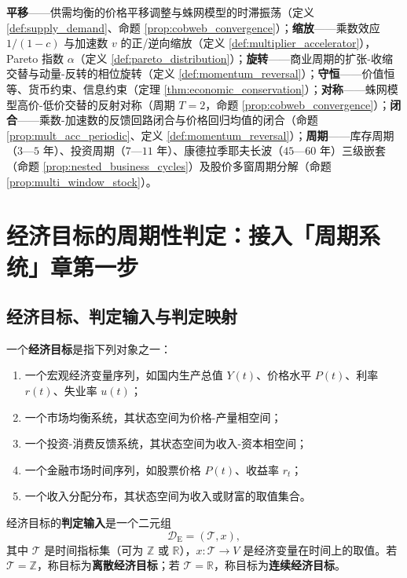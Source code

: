 \begin{remark}[本章七主题导引]\label{rem:econ_seven_themes}
\textbf{平移}——供需均衡的价格平移调整与蛛网模型的时滞振荡（定义 \ref{def:supply_demand}、命题 \ref{prop:cobweb_convergence}）；\textbf{缩放}——乘数效应 $1/(1-c)$ 与加速数 $v$ 的正/逆向缩放（定义 \ref{def:multiplier_accelerator}），Pareto 指数 $\alpha$（定义 \ref{def:pareto_distribution}）；\textbf{旋转}——商业周期的扩张-收缩交替与动量-反转的相位旋转（定义 \ref{def:momentum_reversal}）；\textbf{守恒}——价值恒等、货币约束、信息约束（定理 \ref{thm:economic_conservation}）；\textbf{对称}——蛛网模型高价-低价交替的反射对称（周期 $T=2$，命题 \ref{prop:cobweb_convergence}）；\textbf{闭合}——乘数-加速数的反馈回路闭合与价格回归均值的闭合（命题 \ref{prop:mult_acc_periodic}、定义 \ref{def:momentum_reversal}）；\textbf{周期}——库存周期（$3$—$5$ 年）、投资周期（$7$—$11$ 年）、康德拉季耶夫长波（$45$—$60$ 年）三级嵌套（命题 \ref{prop:nested_business_cycles}）及股价多窗周期分解（命题 \ref{prop:multi_window_stock}）。
\end{remark}

\section{经济目标的周期性判定：接入「周期系统」章第一步}
\label{sec:econ_periodicity_decision}

\subsection{经济目标、判定输入与判定映射}

\begin{definition}[经济目标与判定输入]\label{def:econ_target}
一个\textbf{经济目标}是指下列对象之一：
\begin{enumerate}[label=(\roman*)]
    \item 一个宏观经济变量序列，如国内生产总值 $Y(t)$、价格水平 $P(t)$、利率 $r(t)$、失业率 $u(t)$；
    \item 一个市场均衡系统，其状态空间为价格-产量相空间；
    \item 一个投资-消费反馈系统，其状态空间为收入-资本相空间；
    \item 一个金融市场时间序列，如股票价格 $P(t)$、收益率 $r_t$；
    \item 一个收入分配分布，其状态空间为收入或财富的取值集合。
\end{enumerate}
经济目标的\textbf{判定输入}是一个二元组
\[
\mathcal D_{\mathrm{E}}=(\mathcal T,x),
\]
其中 $\mathcal T$ 是时间指标集（可为 $\mathbb Z$ 或 $\mathbb R$），$x:\mathcal T\to V$ 是经济变量在时间上的取值。若 $\mathcal T=\mathbb Z$，称目标为\textbf{离散经济目标}；若 $\mathcal T=\mathbb R$，称目标为\textbf{连续经济目标}。
\end{definition}

